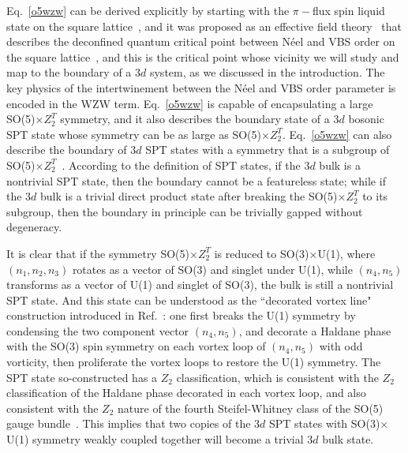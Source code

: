 \documentclass[aps,prb,twocolumn,superscriptaddress,showpacs]{revtex4}
\begin{document}
Eq.~\ref{o5wzw} can be derived explicitly by starting with the
$\pi-$flux spin liquid state on the square
lattice~\cite{deconfinedual}, and it was proposed as an effective
field theory~\cite{senthilfisher} that describes the deconfined
quantum critical point between N\'{e}el and VBS order on the
square lattice~\cite{deconfine1,deconfine2}, and this is the
critical point whose vicinity we will study and map to the
boundary of a $3d$ system, as we discussed in the introduction.
The key physics of the intertwinement between the N\'{e}el and VBS
order parameter is encoded in the WZW term. Eq.~\ref{o5wzw} is
capable of encapsulating a large SO(5)$\times Z_2^T$ symmetry, and
it also describes the boundary state of a $3d$ bosonic SPT state
whose symmetry can be as large as SO(5)$\times Z_2^T$.
Eq.~\ref{o5wzw} can also describe the boundary of $3d$ SPT states
with a symmetry that is a subgroup of SO(5)$\times
Z_2^T$~\cite{senthilashvin,xuclass}. According to the definition
of SPT states, if the $3d$ bulk is a nontrivial SPT state, then
the boundary cannot be a featureless state; while if the $3d$ bulk
is a trivial direct product state after breaking the SO(5)$\times
Z_2^T$ to its subgroup, then the boundary in principle can be
trivially gapped without degeneracy.

It is clear that if the symmetry SO(5)$\times Z_2^T$ is reduced to
SO(3)$\times$U(1), where $(n_1, n_2, n_3)$ rotates as a vector of
SO(3) and singlet under U(1), while $(n_4, n_5)$ transforms as a
vector of U(1) and singlet of SO(3), the bulk is still a
nontrivial SPT state. And this state can be understood as the
``decorated vortex line" construction introduced in
Ref.~: one first breaks the U(1)
symmetry by condensing the two component vector $(n_4, n_5)$, and
decorate a Haldane phase with the SO(3) spin symmetry on each
vortex loop of $(n_4, n_5)$ with odd vorticity, then proliferate
the vortex loops to restore the U(1) symmetry. The SPT state
so-constructed has a $Z_2$ classification, which is consistent
with the $Z_2$ classification of the Haldane phase decorated in
each vortex loop, and also consistent with the $Z_2$ nature of the
fourth Steifel-Whitney class of the SO(5) gauge
bundle~\cite{deconfinedual}. This implies that two copies of the
$3d$ SPT states with SO(3)$\times$U(1) symmetry weakly coupled
together will become a trivial $3d$ bulk state.
\end{document}
